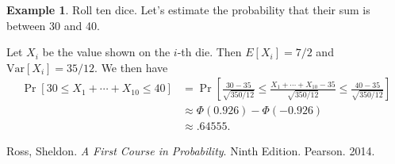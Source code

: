 \documentclass[12pt]{article}
\theoremstyle{plain}
\theoremstyle{definition}
\newtheorem{example}[theorem]{Example}
\theoremstyle{remark}
\newcommand{\Var}{\ensuremath{\textrm{Var}}}
\begin{document}
\begin{example}
    Roll ten dice.
    Let's estimate the probability that their sum is between 30 and 40.

    Let $X_i$ be the value shown on the $i$-th die.
    Then $E[X_i] = 7/2$ and $\Var[X_i] = 35/12$.
    We then have
    \begin{align*}
        \Pr[30 \leq X_1 + \cdots + X_{10} \leq 40] &= \Pr\left[\frac{30-35}{\sqrt{350/12}} \leq \frac{X_1 + \cdots + X_{10}-35}{\sqrt{350/12}} \leq \frac{40-35}{\sqrt{350/12}}\right]\\
        &\approx \Phi(0.926)-\Phi(-0.926)\\
        &\approx .64555.
    \end{align*}
\end{example}


\begin{thebibliography}{13}

 Ross, Sheldon. \textit{A First Course in Probability}. Ninth Edition. Pearson. 2014.



 
\end{thebibliography}
\end{document}
